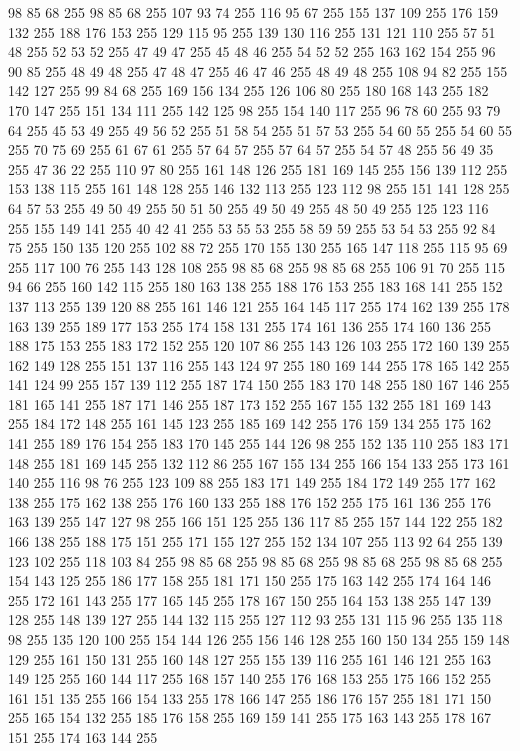 98 85 68 255 98 85 68 255 107 93 74 255 116 95 67 255 155 137 109 255 176 159 132 255 188 176 153 255 129 115 95 255 139 130 116 255 131 121 110 255 57 51 48 255 52 53 52 255 47 49 47 255 45 48 46 255 54 52 52 255 163 162 154 255 96 90 85 255 48 49 48 255 47 48 47 255 46 47 46 255 48 49 48 255 108 94 82 255 155 142 127 255 99 84 68 255 169 156 134 255 126 106 80 255 180 168 143 255 182 170 147 255 151 134 111 255 142 125 98 255 154 140 117 255 96 78 60 255 93 79 64 255 45 53 49 255 49 56 52 255 51 58 54 255 51 57 53 255 54 60 55 255 54 60 55 255 70 75 69 255 61 67 61 255 57 64 57 255 57 64 57 255 54 57 48 255 56 49 35 255 47 36 22 255 110 97 80 255 161 148 126 255 181 169 145 255 156 139 112 255 153 138 115 255 161 148 128 255 146 132 113 255 123 112 98 255 151 141 128 255 64 57 53 255 49 50 49 255 50 51 50 255 49 50 49 255 48 50 49 255 125 123 116 255 155 149 141 255 40 42 41 255 53 55 53 255
58 59 59 255 53 54 53 255 92 84 75 255 150 135 120 255 102 88 72 255 170 155 130 255 165 147 118 255 115 95 69 255 117 100 76 255 143 128 108 255 98 85 68 255 98 85 68 255 106 91 70 255 115 94 66 255 160 142 115 255 180 163 138 255 188 176 153 255 183 168 141 255 152 137 113 255 139 120 88 255 161 146 121 255 164 145 117 255 174 162 139 255 178 163 139 255 189 177 153 255 174 158 131 255 174 161 136 255 174 160 136 255 188 175 153 255 183 172 152 255 120 107 86 255 143 126 103 255 172 160 139 255 162 149 128 255 151 137 116 255 143 124 97 255 180 169 144 255 178 165 142 255 141 124 99 255 157 139 112 255 187 174 150 255 183 170 148 255 180 167 146 255 181 165 141 255 187 171 146 255 187 173 152 255 167 155 132 255 181 169 143 255 184 172 148 255 161 145 123 255 185 169 142 255 176 159 134 255 175 162 141 255 189 176 154 255 183 170 145 255 144 126 98 255 152 135 110 255 183 171 148 255 181 169 145 255 132 112 86 255 167 155 134 255 166 154 133 255 173 161 140 255 116 98 76 255
123 109 88 255 183 171 149 255 184 172 149 255 177 162 138 255 175 162 138 255 176 160 133 255 188 176 152 255 175 161 136 255 176 163 139 255 147 127 98 255 166 151 125 255 136 117 85 255 157 144 122 255 182 166 138 255 188 175 151 255 171 155 127 255 152 134 107 255 113 92 64 255 139 123 102 255 118 103 84 255 98 85 68 255 98 85 68 255 98 85 68 255 98 85 68 255 154 143 125 255 186 177 158 255 181 171 150 255 175 163 142 255 174 164 146 255 172 161 143 255 177 165 145 255 178 167 150 255 164 153 138 255 147 139 128 255 148 139 127 255 144 132 115 255 127 112 93 255 131 115 96 255 135 118 98 255 135 120 100 255 154 144 126 255 156 146 128 255 160 150 134 255 159 148 129 255 161 150 131 255 160 148 127 255 155 139 116 255 161 146 121 255 163 149 125 255 160 144 117 255 168 157 140 255 176 168 153 255 175 166 152 255 161 151 135 255 166 154 133 255 178 166 147 255 186 176 157 255 181 171 150 255 165 154 132 255 185 176 158 255 169 159 141 255 175 163 143 255 178 167 151 255 174 163 144 255
